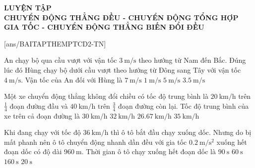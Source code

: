 \begin{center}\textbf{\color{red}LUYỆN TẬP}\\
	\textbf{CHUYỂN ĐỘNG THẲNG ĐỀU - CHUYỂN ĐỘNG TỔNG HỢP\\ GIA TỐC - CHUYỂN ĐỘNG THẲNG BIẾN ĐỔI ĐỀU}
\end{center}
\setcounter{ex}{0}
[ans/BAITAPTHEMPTCD2-TN]

\begin{ex}
	An chạy bộ qua cầu vượt với vận tốc $\SI{3}{\meter/\second}$ theo hướng từ Nam đến Bắc. Đúng lúc đó Hùng chạy bộ dưới cầu vượt theo hướng từ Đông sang Tây với vận tốc $\SI{4}{\meter/\second}$. Vận tốc của An đối với Hùng là 
	\choice
	{$\SI{7}{\meter/\second}$}
	{$\SI{1}{\meter/\second}$}
	{\True $\SI{5}{\meter/\second}$}
	{$\SI{3.5}{\meter/\second}$}
	\loigiai{}
\end{ex}
\begin{ex}
	Một xe chuyển động thẳng không đổi chiều có tốc độ trung bình là $\SI{20}{\kilo\meter/\hour}$ trên  $\frac{1}{4}$ đoạn đường đầu và $\SI{40}{\kilo\meter/\hour}$ trên $\frac{3}{4}$ đoạn đường còn lại. Tốc độ trung bình của xe trên cả đoạn đường là 	
	\choice
	{$\SI{30}{\kilo\meter/\hour}$}
	{\True $\SI{32}{\kilo\meter/\hour}$}
	{$\SI{26.67}{\kilo\meter/\hour}$}
	{$\SI{35}{\kilo\meter/\hour}$}
	\loigiai{}
\end{ex}
\begin{ex}
	Khi đang chạy với tốc độ $\SI{36}{\kilo\meter/\hour}$ thì ô tô bắt đầu chạy xuống dốc. Nhưng do bị mất phanh nên ô tô chuyển động nhanh dần đều với gia tốc $\SI{0.2}{\meter/\second^2}$ xuống hết đoạn dốc có độ dài $\SI{960}{\meter}$. Thời gian ô tô chạy xuống hết đoạn dốc là 
	\choice
	{$\SI{90}{\second}$}
	{\True $\SI{60}{\second}$}
	{$\SI{160}{\second}$}
	{$\SI{20}{\second}$}
	\loigiai{}
\end{ex}
